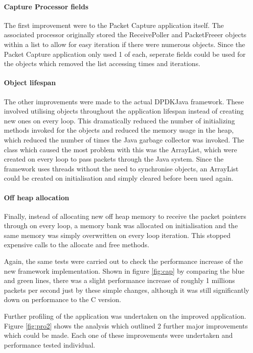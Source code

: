 \documentclass[final_report.tex]{subfiles}
\begin{document}
\paragraph*{Capture Processor fields}
The first improvement were to the Packet Capture application itself. The associated processor originally stored the ReceivePoller and PacketFreeer objects within a list to allow for easy iteration if there were numerous objects. Since the Packet Capture application only used 1 of each, seperate fields could be used for the objects which removed the list accessing times and iterations.

\paragraph*{Object lifespan}
The other improvements were made to the actual DPDKJava framework. These involved utilising objects throughout the application lifespan instead of creating new ones on every loop. This dramatically reduced the number of initializing methods invoked for the objects and reduced the memory usage in the heap, which reduced the number of times the Java garbage collector was invoked. The class which caused the most problem with this was the ArrayList, which were created on every loop to pass packets through the Java system. Since the framework uses threads without the need to synchronise objects, an ArrayList could be created on initialisation and simply cleared before been used again.

\paragraph*{Off heap allocation}
Finally, instead of allocating new off heap memory to receive the packet pointers through on every loop, a memory bank was allocated on initialisation and the same memory was simply overwritten on every loop iteration. This stopped expensive calls to the allocate and free methods.

Again, the same tests were carried out to check the performance increase of the new framework implementation. Shown in figure \ref{fig:cap} by comparing the blue and green lines, there was a slight performance increase of roughly 1 millions packets per second just by these simple changes, although it was still significantly down on performance to the C version.

Further profiling of the application was undertaken on the improved application. Figure \ref{fig:pro2} shows the analysis which outlined 2 further major improvements which could be made. Each one of these improvements were undertaken and performance tested individual.
\end{document}
